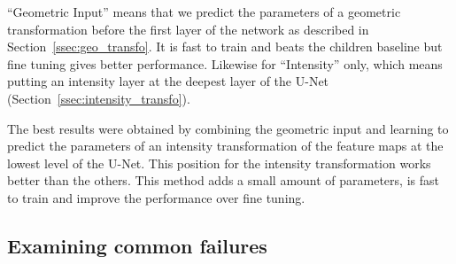 ``Geometric Input'' means that we predict the parameters of a geometric transformation before the first layer of the network as described in Section~\ref{ssec:geo_transfo}. It is fast to train and beats the children baseline but fine tuning gives better performance. Likewise for ``Intensity'' only, which means putting an intensity layer at the deepest layer of the U-Net (Section~\ref{ssec:intensity_transfo}).

The best results were obtained by combining the geometric input and learning to predict the parameters of an intensity transformation of the feature maps at the lowest level of the U-Net. This position for the intensity transformation works better than the others. This method adds a small amount of parameters, is fast to train and improve the performance over fine tuning.

\subsection{Examining common failures}


